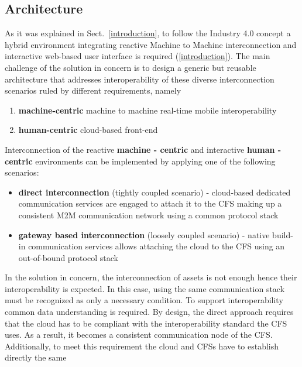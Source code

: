 \documentclass{jacsart}
\begin{document}
\hypertarget{architecture}{%
      \subsection{Architecture}\label{architecture}}

As it was explained in Sect.~\ref*{introduction}, to follow the Industry 4.0 concept a hybrid environment integrating reactive Machine to Machine interconnection and interactive web-based user interface is required (\ref*{introduction}). The main challenge of the solution in concern is to design a generic but reusable architecture that addresses interoperability of these diverse interconnection scenarios ruled by different requirements, namely

\begin{enumerate}
      \item \textbf{machine-centric} machine to machine real-time mobile interoperability
      \item \textbf{human-centric} cloud-based front-end
\end{enumerate}

Interconnection of the reactive \textbf{machine - centric} and interactive \textbf{human - centric} environments can be implemented by applying one of the following scenarios:

\begin{itemize}
      \item \textbf{direct interconnection} (tightly coupled scenario) - cloud-based dedicated communication services are engaged to attach it to the CFS making up a consistent M2M communication network using a common protocol stack
      \item \textbf{gateway based interconnection} (loosely coupled scenario) - native build-in communication services allows attaching the cloud to the CFS using an out-of-bound protocol stack
\end{itemize}

In the solution in concern, the interconnection of assets is not enough hence their interoperability is expected. In this case, using the same communication stack must be recognized as only a necessary condition. To support interoperability common data understanding is required. By design, the direct approach requires that the cloud has to be compliant
with the interoperability standard the CFS uses. As a result, it becomes a consistent communication node of the CFS. Additionally, to meet this requirement the cloud and CFSs have to establish directly the same
\end{document}
